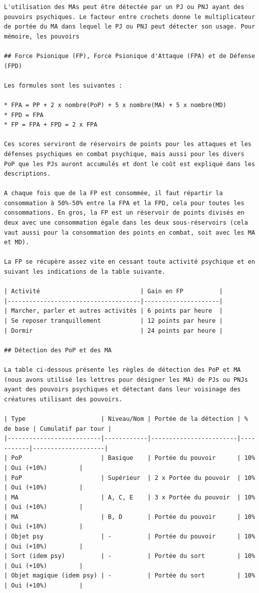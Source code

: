 \documentclass[11pt]{article}
\begin{document}
{\begin{verbatim}
L'utilisation des MAs peut être détectée par un PJ ou PNJ ayant des pouvoirs psychiques. Le facteur entre crochets donne le multiplicateur de portée du MA dans lequel le PJ ou PNJ peut détecter son usage. Pour mémoire, les pouvoirs

## Force Psionique (FP), Force Psionique d'Attaque (FPA) et de Défense (FPD)

Les formules sont les suivantes :

* FPA = PP + 2 x nombre(PoP) + 5 x nombre(MA) + 5 x nombre(MD)
* FPD = FPA
* FP = FPA + FPD = 2 x FPA

Ces scores serviront de réservoirs de points pour les attaques et les défenses psychiques en combat psychique, mais aussi pour les divers PoP que les PJs auront accumulés et dont le coût est expliqué dans les descriptions.

A chaque fois que de la FP est consommée, il faut répartir la consommation à 50%-50% entre la FPA et la FPD, cela pour toutes les consommations. En gros, la FP est un réservoir de points divisés en deux avec une consommation égale dans les deux sous-réservoirs (cela vaut aussi pour la consommation des points en combat, soit avec les MA et MD).

La FP se récupère assez vite en cessant toute activité psychique et en suivant les indications de la table suivante.

| Activité                            | Gain en FP          |
|-------------------------------------|---------------------|
| Marcher, parler et autres activités | 6 points par heure  |
| Se reposer tranquillement           | 12 points par heure |
| Dormir                              | 24 points par heure |

## Détection des PoP et des MA

La table ci-dessous présente les règles de détection des PoP et MA (nous avons utilisé les lettres pour désigner les MA) de PJs ou PNJs ayant des pouvoirs psychiques et détectant dans leur voisinage des créatures utilisant des pouvoirs.

| Type                     | Niveau/Nom | Portée de la détection | % de base | Cumulatif par tour |
|--------------------------|------------|------------------------|-----------|--------------------|
| PoP                      | Basique    | Portée du pouvoir      | 10%       | Oui (+10%)         |
| PoP                      | Supérieur  | 2 x Portée du pouvoir  | 10%       | Oui (+10%)         |
| MA                       | A, C, E    | 3 x Portée du pouvoir  | 10%       | Oui (+10%)         |
| MA                       | B, D       | Portée du pouvoir      | 10%       | Oui (+10%)         |
| Objet psy                | -          | Portée du pouvoir      | 10%       | Oui (+10%)         |
| Sort (idem psy)          | -          | Portée du sort         | 10%       | Oui (+10%)         |
| Objet magique (idem psy) | -          | Portée du sort         | 10%       | Oui (+10%)         |


\end{verbatim}}
\end{document}
